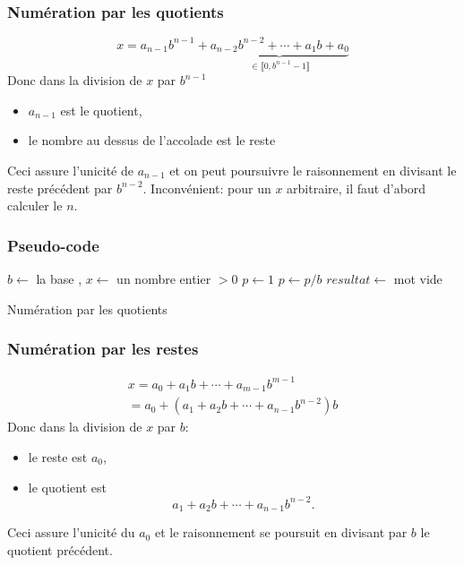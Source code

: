 \begin{frame}
 \frametitle{Numération par les quotients}
\begin{displaymath}
 x = a_{n-1}b^{n-1} + \underset{\in \llbracket 0 ,b^{n-1}-1\rrbracket}{\underbrace{a_{n-2}b^{n-2}  + \cdots + a_1 b + a_0}}
\end{displaymath}
Donc dans la division de $x$ par $b^{n-1}$
\begin{itemize}
 \item $a_{n-1}$ est le quotient,
 \item le nombre au dessus de l'accolade est le reste
\end{itemize}
Ceci assure l'unicité de $a_{n-1}$ et on peut poursuivre le raisonnement en divisant le reste précédent par $b^{n-2}$.\newline
Inconvénient: pour un $x$ arbitraire, il faut d'abord calculer le $n$.
\end{frame}

\begin{frame}
 \frametitle{Pseudo-code}
\begin{algorithm}[H]
 $b \leftarrow $ la base , $x \leftarrow $ un nombre entier $>0$ \;
 $p \leftarrow 1$\;
 $p \leftarrow p / b$\;
 $resultat \leftarrow$ mot vide \;
 \;
     \caption{Numération par les quotients}
\end{algorithm}
\end{frame}

\begin{frame}
 \frametitle{Numération par les restes}
\begin{multline*}
 x= a_0 + a_1 b +\cdots +a_{m-1}b^{m-1} \\
 = a_0 +(a_1+a_2b+\cdots+a_{n-1}b^{n-2})b
\end{multline*}
Donc dans la division de $x$ par $b$:
\begin{itemize}
 \item le reste est $a_0$,
 \item le quotient est 
\begin{displaymath}
a_1+a_2b+\cdots+a_{n-1}b^{n-2}. 
\end{displaymath}
\end{itemize}
Ceci assure l'unicité du $a_0$ et le raisonnement se poursuit en divisant par $b$ le quotient précédent.
\end{frame}

